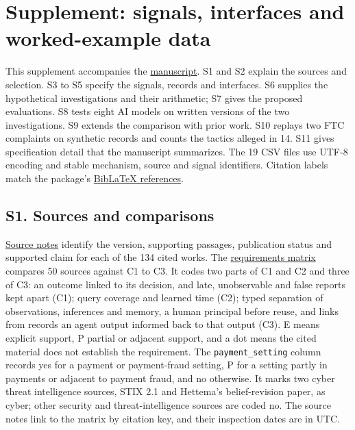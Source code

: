 \documentclass[
  11pt,
]{article}
\author{}
\date{}
\begin{document}
\FloatBarrier

\begingroup\raggedright{}

\hypertarget{supplement-signals-interfaces-and-worked-example-data}{%
\section{Supplement: signals, interfaces and worked-example
data}\label{supplement-signals-interfaces-and-worked-example-data}}

\endgroup

\suppressfloats[t]

This supplement accompanies the \href{MANUSCRIPT.md}{manuscript}. S1 and
S2 explain the sources and selection. S3 to S5 specify the signals,
records and interfaces. S6 supplies the hypothetical investigations and
their arithmetic; S7 gives the proposed evaluations. S8 tests eight AI
models on written versions of the two investigations. S9 extends the
comparison with prior work. S10 replays two FTC complaints on synthetic
records and counts the tactics alleged in 14. S11 gives specification
detail that the manuscript summarizes. The 19 CSV files use \mbox{UTF-8}
encoding and stable mechanism, source and signal identifiers. Citation
labels match the package's \href{REFERENCES.bib}{BibLaTeX references}.

\FloatBarrier

\hypertarget{s1.-sources-and-comparisons}{%
\subsection{S1. Sources and
comparisons}\label{s1.-sources-and-comparisons}}

\suppressfloats[t]

\href{SUPPLEMENT/S1_CITED_SOURCE_NOTES.csv}{Source notes} identify the
version, supporting passages, publication status and supported claim for
each of the 134 cited works. The
\href{SUPPLEMENT/S1_REQUIREMENTS_MATRIX.csv}{requirements matrix}
compares 50 sources against C1 to C3. It codes two parts of C1 and C2
and three of C3: an outcome linked to its decision, and late,
unobservable and false reports kept apart (C1); query coverage and
learned time (C2); typed separation of observations, inferences and
memory, a human principal before reuse, and links from records an agent
output informed back to that output (C3). E means explicit support, P
partial or adjacent support, and a dot means the cited material does not
establish the requirement. The \texttt{payment\_setting} column records
yes for a payment or payment-fraud setting, P for a setting partly in
payments or adjacent to payment fraud, and no otherwise. It marks two
cyber threat intelligence sources, STIX 2.1 and Hettema's
belief-revision paper, as cyber; other security and threat-intelligence
sources are coded no. The source notes link to the matrix by citation
key, and their inspection dates are in UTC.
\end{document}
